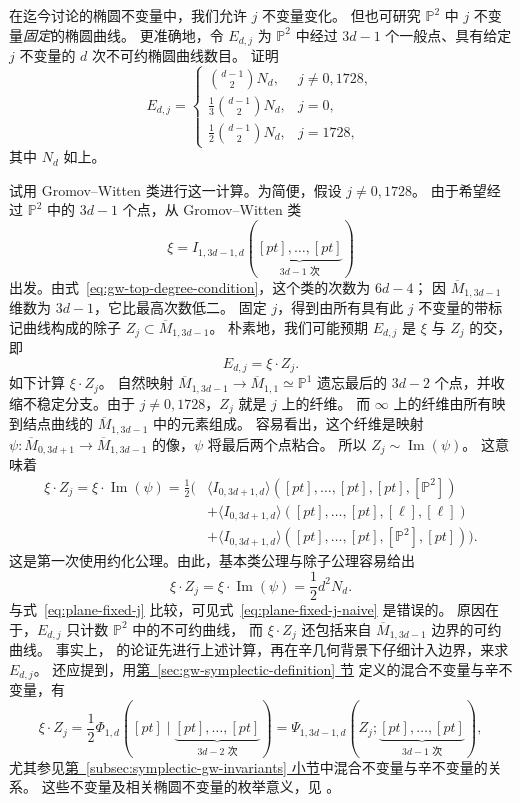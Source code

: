 \begin{example}
在迄今讨论的椭圆不变量中，我们允许 $j$ 不变量变化。
但也可研究 $\mathbb P^2$ 中 $j$ 不变量\emph{固定}的椭圆曲线。
更准确地，令 $E_{d,j}$ 为 $\mathbb P^2$ 中经过 $3d-1$ 个一般点、具有给定 $j$ 不变量的
$d$ 次不可约椭圆曲线数目。
 证明
\begin{equation}\label{eq:plane-fixed-j}
E_{d,j}=\begin{cases}
\binom{d-1}{2}N_d,&j\ne0,1728,\\
\frac13\binom{d-1}{2}N_d,&j=0,\\
\frac12\binom{d-1}{2}N_d,&j=1728,
\end{cases}
\end{equation}
其中 $N_d$ 如上。

试用 Gromov--Witten 类进行这一计算。为简便，假设 $j\ne0,1728$。
由于希望经过 $\mathbb P^2$ 中的 $3d-1$ 个点，从 Gromov--Witten 类
\[
\xi=I_{1,3d-1,d}(\underbrace{[pt],\ldots,[pt]}_{3d-1\text{ 次}})
\]
出发。由式~\eqref{eq:gw-top-degree-condition}，这个类的次数为 $6d-4$；
因 $\overline M_{1,3d-1}$ 维数为 $3d-1$，它比最高次数低二。
固定 $j$，得到由所有具有此 $j$ 不变量的带标记曲线构成的除子
$Z_j\subset\overline M_{1,3d-1}$。
朴素地，我们可能预期 $E_{d,j}$ 是 $\xi$ 与 $Z_j$ 的交，即
\begin{equation}\label{eq:plane-fixed-j-naive}
E_{d,j}=\xi\cdot Z_j.
\end{equation}
如下计算 $\xi\cdot Z_j$。
自然映射 $\overline M_{1,3d-1}\to\overline M_{1,1}\simeq\mathbb P^1$
遗忘最后的 $3d-2$ 个点，并收缩不稳定分支。由于 $j\ne0,1728$，$Z_j$ 就是 $j$ 上的纤维。
而 $\infty$ 上的纤维由所有映到结点曲线的 $\overline M_{1,3d-1}$ 中的元素组成。
容易看出，这个纤维是映射
$\psi:\overline M_{0,3d+1}\to\overline M_{1,3d-1}$ 的像，$\psi$ 将最后两个点粘合。
所以 $Z_j\sim\operatorname{Im}(\psi)$。
这意味着
\[
\begin{aligned}
\xi\cdot Z_j=\xi\cdot\operatorname{Im}(\psi)=\frac12\Big(&
\langle I_{0,3d+1,d}\rangle([pt],\ldots,[pt],[pt],[\mathbb P^2])\\
&+\langle I_{0,3d+1,d}\rangle([pt],\ldots,[pt],[\ell],[\ell])\\
&+\langle I_{0,3d+1,d}\rangle([pt],\ldots,[pt],[\mathbb P^2],[pt])\Big).
\end{aligned}
\]
这是第一次使用约化公理。由此，基本类公理与除子公理容易给出
\[
\xi\cdot Z_j=\xi\cdot\operatorname{Im}(\psi)=\frac12d^2N_d.
\]
与式~\eqref{eq:plane-fixed-j} 比较，可见式~\eqref{eq:plane-fixed-j-naive} 是错误的。
原因在于，$E_{d,j}$ 只计数 $\mathbb P^2$ 中的不可约曲线，
而 $\xi\cdot Z_j$ 还包括来自 $\overline M_{1,3d-1}$ 边界的可约曲线。
事实上， 的论证先进行上述计算，再在辛几何背景下仔细计入边界，来求 $E_{d,j}$。
还应提到，用\hyperref[sec:gw-symplectic-definition]{第~\ref*{sec:gw-symplectic-definition} 节}
定义的混合不变量与辛不变量，有
\[
\xi\cdot Z_j=\frac12\Phi_{1,d}([pt]\mid\underbrace{[pt],\ldots,[pt]}_{3d-2\text{ 次}})
=\Psi_{1,3d-1,d}(Z_j;\underbrace{[pt],\ldots,[pt]}_{3d-1\text{ 次}}),
\]
尤其参见\hyperref[subsec:symplectic-gw-invariants]{第~\ref*{subsec:symplectic-gw-invariants} 小节}中混合不变量与辛不变量的关系。
这些不变量及相关椭圆不变量的枚举意义，见 。
\end{example}
